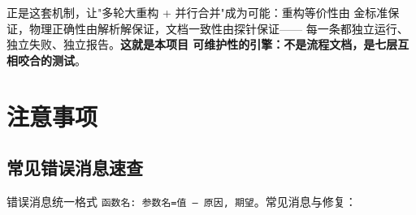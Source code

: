 \documentclass[12pt,a4paper]{ctexart}
\newcommand{\fem}{\Verb}
\begin{document}
正是这套机制，让"多轮大重构 + 并行合并"成为可能：重构等价性由
金标准保证，物理正确性由解析解保证，文档一致性由探针保证——
每一条都独立运行、独立失败、独立报告。\textbf{这就是本项目
可维护性的引擎：不是流程文档，是七层互相咬合的测试}。

\section{注意事项}

\subsection{常见错误消息速查}

错误消息统一格式 \fem|函数名: 参数名=值 — 原因, 期望|。常见消息与修复：
\end{document}
